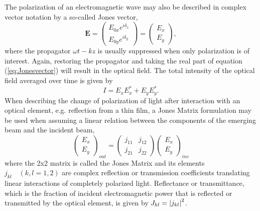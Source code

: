 The polarization of an electromagnetic wave may also be described in complex vector notation by a so-called Jones vector, 
\begin{equation}
    \mathbf{E} = 
    \begin{pmatrix}
        E_{0x}e^{i\delta_x} \\
        E_{0y}e^{i\delta_y} 
    \end{pmatrix}
    =
    \begin{pmatrix}
        E_{x} \\
        E_{y} 
    \end{pmatrix},
    \label{eq:Jonesvector}
\end{equation}
where the propagator $\omega t - kz$ is usually suppressed when only polarization is of interest\cite{collett}. Again, restoring the propagator and taking the real part of equation (\ref{eq:Jonesvector}) will result in the optical field. The total intensity of the optical field averaged over time is given by
\begin{equation}
    I = E_xE_x^* + E_yE_y^*.
\end{equation}
When describing the change of polarization of light after interaction with an optical element, e.g. reflection from a thin film, a Jones Matrix formulation may be used when assuming a linear relation between the components of the emerging beam and the incident beam,
\begin{equation}
    \begin{pmatrix}
        E_{x} \\
        E_{y} 
    \end{pmatrix}_{out}
    =
    \begin{pmatrix}
        j_{11} & j_{12} \\
        j_{21} & j_{22} 
    \end{pmatrix}
    \begin{pmatrix}
        E_{x} \\
        E_{y} 
    \end{pmatrix}_{inc}
\end{equation}
where the 2x2 matrix is called the Jones Matrix and its elements $j_{kl}\quad(k,l = 1,2)$ are complex reflection or transmission coefficients translating linear interactions of completely polarized light. Reflectance or transmittance, which is the fraction of incident electromagnetic power that is reflected or transmitted by the optical element, is given by $J_{kl} = \left| j_{kl} \right|^2$.

